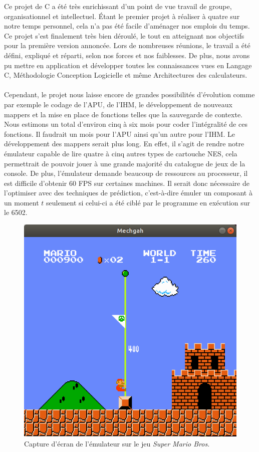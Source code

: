 Ce projet de C a été très enrichissant d'un point de vue travail de groupe, organisationnel et intellectuel. Étant le premier projet à réaliser à quatre sur notre temps personnel, cela n'a pas été facile d'aménager nos emplois du temps. Ce projet s'est finalement très bien déroulé, le tout en atteignant nos objectifs pour la première version annoncée. Lors de nombreuses réunions, le travail a été défini, expliqué et réparti, selon nos forces et nos faiblesses. De plus, nous avons pu mettre en application et développer toutes les connaissances vues en Langage C, Méthodologie Conception Logicielle et même Architectures des calculateurs.

\paragraph{}
 Cependant, le projet nous laisse encore de grandes possibilités d'évolution comme par exemple le codage de l'APU, de l'IHM, le développement de nouveaux mappers et la mise en place de fonctions telles que la sauvegarde de contexte. Nous estimons un total d'environ cinq à six mois pour coder l'intégralité de ces fonctions. Il faudrait un mois pour l'APU ainsi qu'un autre pour l'IHM. Le développement des mappers serait plus long. En effet, il s'agit de rendre notre émulateur capable de lire quatre à cinq autres types de cartouche NES, cela permettrait de pouvoir jouer à une grande majorité du catalogue de jeux de la console. De plus, l'émulateur demande beaucoup de ressources au processeur, il est difficile d'obtenir 60 FPS sur certaines machines. Il serait donc nécessaire de l'optimiser avec des techniques de prédiction, c'est-à-dire émuler un composant à un moment $t$ seulement si celui-ci a été ciblé par le programme en exécution sur le 6502.

\begin{figure}[H]
  \centering
   \includegraphics[width=0.50\linewidth]{images/smb_nes.png}
   \caption{Capture d'écran de l'émulateur sur le jeu \emph{Super Mario Bros.}}
   \label{fig:capture}
\end{figure}

